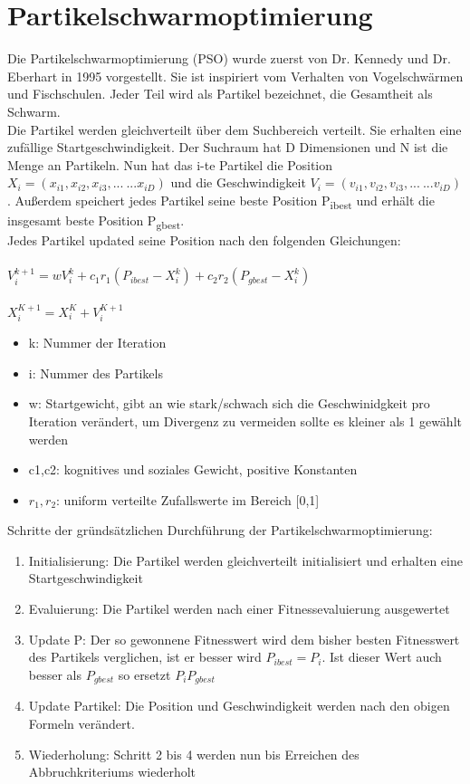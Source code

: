 \section{Partikelschwarmoptimierung}
Die Partikelschwarmoptimierung (PSO) wurde zuerst von Dr. Kennedy und Dr. Eberhart in 1995 vorgestellt\cite{kennedy1942particle}.
Sie ist inspiriert vom Verhalten von Vogelschwärmen und Fischschulen. Jeder Teil wird als Partikel bezeichnet, die Gesamtheit als Schwarm.
\\ Die Partikel werden gleichverteilt über dem Suchbereich verteilt. Sie erhalten eine zufällige Startgeschwindigkeit. 
Der Suchraum hat D Dimensionen und N ist die Menge an Partikeln. Nun hat das i-te Partikel die Position $X_i=(x_{i1},x_{i2},x_{i3},...\ ...x_{iD})$
  und die Geschwindigkeit
  $V_{i}=(v_{i1},v_{i2},v_{i3},...\ ...v_{iD})$. Außerdem speichert jedes Partikel seine beste Position P\textsubscript{ibest} und erhält die insgesamt beste Position P\textsubscript{gbest}. 
\\
Jedes Partikel updated seine Position nach den folgenden Gleichungen:\\\\
\large $V_i^{k+1}=wV_i^k+c_1r_1(P_{ibest}-X_i^k)+c_2r_2(P_{gbest}-X_i^k)$
\\\\\normalsize
$X_i^{K+1}=X_i^K+V_i^{K+1}$
\begin{itemize}

  \item k: Nummer der Iteration
  \item i: Nummer des Partikels
  \item w: Startgewicht, gibt an wie stark/schwach sich die Geschwinidgkeit pro Iteration verändert, um Divergenz zu vermeiden sollte es  kleiner als 1 gewählt werden
  \item c1,c2: kognitives und soziales Gewicht, positive Konstanten
  \item $r_1,r_2$: uniform verteilte Zufallswerte im Bereich [0,1]

\end{itemize}
Schritte der gründsätzlichen Durchführung der Partikelschwarmoptimierung:
\begin{enumerate}
  \item Initialisierung: Die Partikel werden gleichverteilt initialisiert und erhalten eine Startgeschwindigkeit
  \item Evaluierung: Die Partikel werden nach einer Fitnessevaluierung ausgewertet 
  \item Update P: Der so gewonnene Fitnesswert wird dem bisher besten Fitnesswert des Partikels verglichen, ist er besser wird $P_{ibest}=P_i$. Ist dieser Wert auch besser als $P_{gbest}$ so ersetzt $P_i P_{gbest}$
  \item Update Partikel: Die Position und Geschwindigkeit werden nach den obigen Formeln verändert.
  \item Wiederholung: Schritt 2 bis 4 werden nun bis Erreichen des Abbruchkriteriums wiederholt
\end{enumerate}
